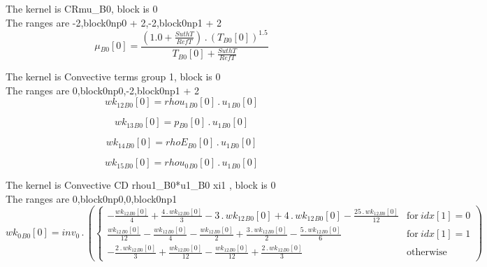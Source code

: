 \documentclass{article}
\begin{document}
\noindent The kernel is CRmu_B0, block is 0\\\noindent The ranges are -2,block0np0 + 2,-2,block0np1 + 2\\\begin{dmath}{\mu{_{B0}}}[{0}] = \frac{\left(1.0 + \frac{SuthT}{RefT}\right) \,.\, \left({T{_{B0}}}[{0}] \right)^{1.5}}{{T{_{B0}}}[{0}] + \frac{SuthT}{RefT}}\end{dmath}

\noindent The kernel is Convective terms group 1, block is 0\\\noindent The ranges are 0,block0np0,-2,block0np1 + 2\\\begin{dmath}{wk_{12}{_{B0}}}[{0}] = {rhou_{1}{_{B0}}}[{0}] \,.\, {u_{1}{_{B0}}}[{0}]\end{dmath}

\begin{dmath}{wk_{13}{_{B0}}}[{0}] = {p{_{B0}}}[{0}] \,.\, {u_{1}{_{B0}}}[{0}]\end{dmath}

\begin{dmath}{wk_{14}{_{B0}}}[{0}] = {rhoE{_{B0}}}[{0}] \,.\, {u_{1}{_{B0}}}[{0}]\end{dmath}

\begin{dmath}{wk_{15}{_{B0}}}[{0}] = {rhou_{0}{_{B0}}}[{0}] \,.\, {u_{1}{_{B0}}}[{0}]\end{dmath}

\noindent The kernel is Convective CD rhou1_B0*u1_B0 xi1 , block is 0\\\noindent The ranges are 0,block0np0,0,block0np1\\\begin{dmath}{wk_{0}{_{B0}}}[{0}] = inv_0 \,.\, \left(\begin{cases} - \frac{{wk_{12}{_{B0}}}[{0}]}{4} + \frac{4 \,.\, {wk_{12}{_{B0}}}[{0}]}{3} - 3 \,.\, {wk_{12}{_{B0}}}[{0}] + 4 \,.\, {wk_{12}{_{B0}}}[{0}] - \frac{25 \,.\, 
{wk_{12}{_{B0}}}[{0}]}{12} & \text{for}\: {idx}[{1}] = 0 \\\frac{{wk_{12}{_{B0}}}[{0}]}{12} - \frac{{wk_{12}{_{B0}}}[{0}]}{4} - \frac{{wk_{12}{_{B0}}}[{0}]}{2} + \frac{3 \,.\, {wk_{12}{_{B0}}}[{0}]}{2} - \frac{5 \,.\, {wk_{12}{_{B0}}}[{0}]}{6} & 
\text{for}\: {idx}[{1}] = 1 \\- \frac{2 \,.\, {wk_{12}{_{B0}}}[{0}]}{3} + \frac{{wk_{12}{_{B0}}}[{0}]}{12} - \frac{{wk_{12}{_{B0}}}[{0}]}{12} + \frac{2 \,.\, {wk_{12}{_{B0}}}[{0}]}{3} & \text{otherwise} \end{cases}\right)\end{dmath}
\end{document}
